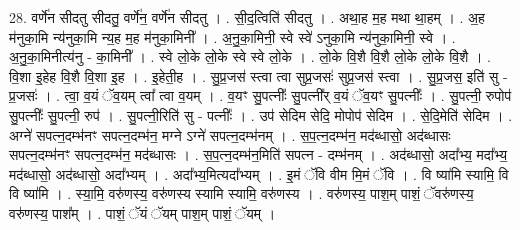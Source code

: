 \documentclass[17pt]{extarticle}
\begin{document}
28. वर्णे॑न सीदतु सीदतु॒ वर्णे॑न॒ वर्णे॑न सीदतु । . सी॒द॒त्विति॑ सीदतु । . अथा॒ह म॒ह मथा था॒हम् । . अ॒ह म॑नुका॒मि न्य॑नुका॒मि न्य॒ह म॒ह म॑नुका॒मिनी᳚ । . अ॒नु॒का॒मिनी॒ स्वे स्वे॑ ऽनुका॒मि न्य॑नुका॒मिनी॒ स्वे । . अ॒नु॒का॒मिनीत्य॑नु - का॒मिनी᳚ । . स्वे लो॒के लो॒के स्वे स्वे लो॒के । . लो॒के वि॒शै वि॒शै लो॒के लो॒के वि॒शै । . वि॒शा इ॒हेह वि॒शै वि॒शा इ॒ह । . इ॒हेती॒ह । . सु॒प्र॒जस॑ स्त्वा त्वा सुप्र॒जसः॑ सुप्र॒जस॑ स्त्वा । . सु॒प्र॒जस॒ इति॑ सु - प्र॒जसः॑ । . त्वा॒ व॒यं ॅव॒यम् त्वा᳚ त्वा व॒यम् । . व॒यꣳ सु॒पत्नीः᳚ सु॒पत्नी᳚र् व॒यं ॅव॒यꣳ सु॒पत्नीः᳚ । . सु॒पत्नी॒ रुपोप॑ सु॒पत्नीः᳚ सु॒पत्नी॒ रुप॑ । . सु॒पत्नी॒रिति॑ सु - पत्नीः᳚ । . उप॑ सेदिम सेदि॒ मोपोप॑ सेदिम । . से॒दि॒मेति॑ सेदिम । . अग्ने॑ सपत्न॒दम्भ॑नꣳ सपत्न॒दम्भ॑न॒ मग्ने ऽग्ने॑ सपत्न॒दम्भ॑नम् । . स॒प॒त्न॒दम्भ॑न॒ मद॑ब्धासो॒ अद॑ब्धासः सपत्न॒दम्भ॑नꣳ सपत्न॒दम्भ॑न॒ मद॑ब्धासः । . स॒प॒त्न॒दम्भ॑न॒मिति॑ सपत्न - दम्भ॑नम् । . अद॑ब्धासो॒ अदा᳚भ्य॒ मदा᳚भ्य॒ मद॑ब्धासो॒ अद॑ब्धासो॒ अदा᳚भ्यम् । . अदा᳚भ्य॒मित्यदा᳚भ्यम् । . इ॒मं ॅवि वीम मि॒मं ॅवि । . वि ष्या॑मि स्यामि॒ वि वि ष्या॑मि । . स्या॒मि॒ वरु॑णस्य॒ वरु॑णस्य स्यामि स्यामि॒ वरु॑णस्य । . वरु॑णस्य॒ पाश॒म् पाशं॒ ॅवरु॑णस्य॒ वरु॑णस्य॒ पाश᳚म् । . पाशं॒ ॅयं ॅयम् पाश॒म् पाशं॒ ॅयम् । \newline
\end{document}
